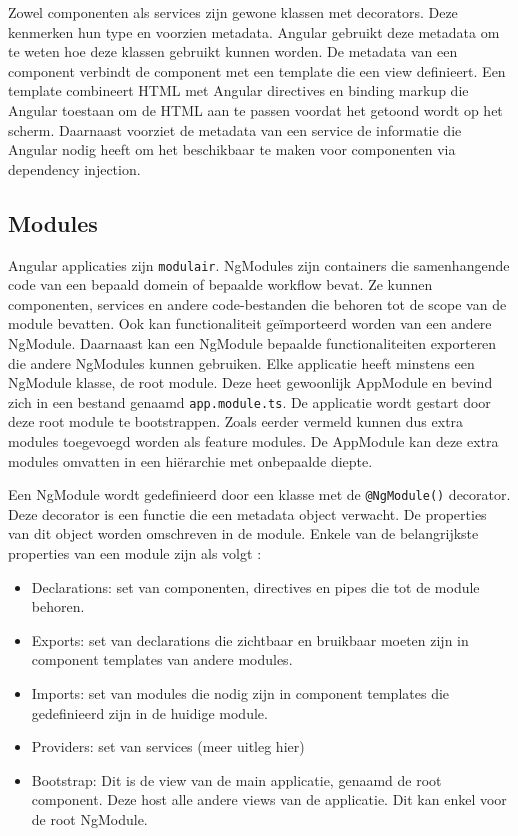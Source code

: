 Zowel componenten als services zijn gewone klassen met decorators. Deze kenmerken hun type en voorzien metadata. Angular gebruikt deze metadata om te weten hoe deze klassen gebruikt kunnen worden. De metadata van een component verbindt de component met een template die een view definieert. Een template combineert HTML met Angular directives en binding markup die Angular toestaan om de HTML aan te passen voordat het getoond wordt op het scherm. Daarnaast voorziet de metadata van een service de informatie die Angular nodig heeft om het beschikbaar te maken voor componenten via dependency injection. \autocite{Angular2019a}

\subsection{Modules}

Angular applicaties zijn \texttt{modulair}. NgModules zijn containers die samenhangende code van een bepaald domein of bepaalde workflow bevat. Ze kunnen componenten, services en andere code-bestanden die behoren tot de scope van de module bevatten. Ook kan functionaliteit geïmporteerd worden van een andere NgModule. Daarnaast kan een NgModule bepaalde functionaliteiten exporteren die andere NgModules kunnen gebruiken. Elke applicatie heeft minstens een NgModule klasse, de root module. Deze heet gewoonlijk AppModule en bevind zich in een bestand genaamd \texttt{app.module.ts}. De applicatie wordt gestart door deze root module te bootstrappen. Zoals eerder vermeld kunnen dus extra modules toegevoegd worden als feature modules. De AppModule kan deze extra modules omvatten in een hiërarchie met onbepaalde diepte. \autocite{Angular2019b}

Een NgModule wordt gedefinieerd door een klasse met de \texttt{@NgModule()} decorator. Deze decorator is een functie die een metadata object verwacht. De properties van dit object worden omschreven in de module. Enkele van de belangrijkste properties van een module zijn als volgt \autocite{Angular2019b}:
\begin{itemize}
    \item Declarations: set van componenten, directives en pipes die tot de module behoren.
    \item Exports: set van declarations die zichtbaar en bruikbaar moeten zijn in component templates van andere modules.
    \item Imports: set van modules die nodig zijn in component templates die gedefinieerd zijn in de huidige module.
    \item Providers: set van services (meer uitleg hier)
    \item Bootstrap: Dit is de view van de main applicatie, genaamd de root component. Deze host alle andere views van de applicatie. Dit kan enkel voor de root NgModule. 
\end{itemize}


